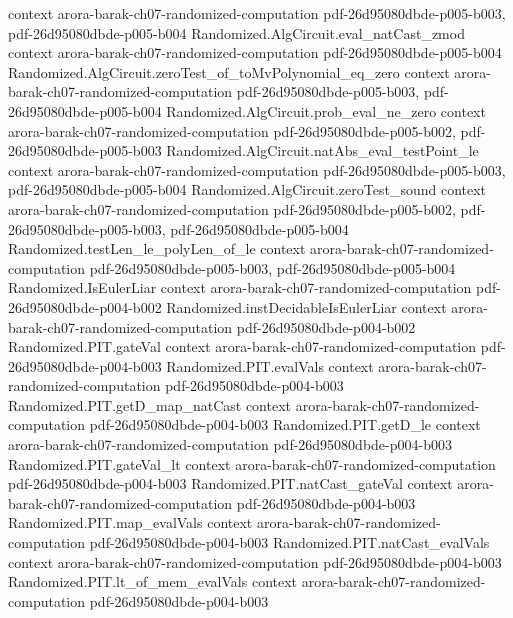 \begin{theorem}
  {context}
  {arora-barak-ch07-randomized-computation}
  {pdf-26d95080dbde-p005-b003,
    pdf-26d95080dbde-p005-b004}
\proofstep
  {Randomized.AlgCircuit.eval_natCast_zmod}
  {context}
  {arora-barak-ch07-randomized-computation}
  {pdf-26d95080dbde-p005-b004}
\proofstep
  {Randomized.AlgCircuit.zeroTest_of_toMvPolynomial_eq_zero}
  {context}
  {arora-barak-ch07-randomized-computation}
  {pdf-26d95080dbde-p005-b003,
    pdf-26d95080dbde-p005-b004}
\proofstep
  {Randomized.AlgCircuit.prob_eval_ne_zero}
  {context}
  {arora-barak-ch07-randomized-computation}
  {pdf-26d95080dbde-p005-b002,
    pdf-26d95080dbde-p005-b003}
\proofstep
  {Randomized.AlgCircuit.natAbs_eval_testPoint_le}
  {context}
  {arora-barak-ch07-randomized-computation}
  {pdf-26d95080dbde-p005-b003,
    pdf-26d95080dbde-p005-b004}
\proofstep
  {Randomized.AlgCircuit.zeroTest_sound}
  {context}
  {arora-barak-ch07-randomized-computation}
  {pdf-26d95080dbde-p005-b002,
    pdf-26d95080dbde-p005-b003,
    pdf-26d95080dbde-p005-b004}
\proofstep
  {Randomized.testLen_le_polyLen_of_le}
  {context}
  {arora-barak-ch07-randomized-computation}
  {pdf-26d95080dbde-p005-b003,
    pdf-26d95080dbde-p005-b004}
\proofstep
  {Randomized.IsEulerLiar}
  {context}
  {arora-barak-ch07-randomized-computation}
  {pdf-26d95080dbde-p004-b002}
\proofstep
  {Randomized.instDecidableIsEulerLiar}
  {context}
  {arora-barak-ch07-randomized-computation}
  {pdf-26d95080dbde-p004-b002}
\proofstep
  {Randomized.PIT.gateVal}
  {context}
  {arora-barak-ch07-randomized-computation}
  {pdf-26d95080dbde-p004-b003}
\proofstep
  {Randomized.PIT.evalVals}
  {context}
  {arora-barak-ch07-randomized-computation}
  {pdf-26d95080dbde-p004-b003}
\proofstep
  {Randomized.PIT.getD_map_natCast}
  {context}
  {arora-barak-ch07-randomized-computation}
  {pdf-26d95080dbde-p004-b003}
\proofstep
  {Randomized.PIT.getD_le}
  {context}
  {arora-barak-ch07-randomized-computation}
  {pdf-26d95080dbde-p004-b003}
\proofstep
  {Randomized.PIT.gateVal_lt}
  {context}
  {arora-barak-ch07-randomized-computation}
  {pdf-26d95080dbde-p004-b003}
\proofstep
  {Randomized.PIT.natCast_gateVal}
  {context}
  {arora-barak-ch07-randomized-computation}
  {pdf-26d95080dbde-p004-b003}
\proofstep
  {Randomized.PIT.map_evalVals}
  {context}
  {arora-barak-ch07-randomized-computation}
  {pdf-26d95080dbde-p004-b003}
\proofstep
  {Randomized.PIT.natCast_evalVals}
  {context}
  {arora-barak-ch07-randomized-computation}
  {pdf-26d95080dbde-p004-b003}
\proofstep
  {Randomized.PIT.lt_of_mem_evalVals}
  {context}
  {arora-barak-ch07-randomized-computation}
  {pdf-26d95080dbde-p004-b003}

\end{theorem}
